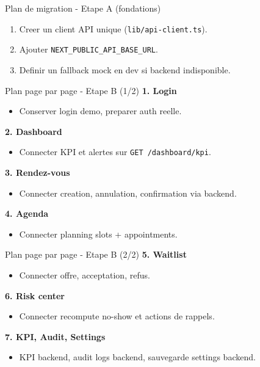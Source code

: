\documentclass[10pt,aspectratio=169]{beamer}
\begin{document}
\begin{frame}{Plan de migration - Etape A (fondations)}
  \begin{enumerate}
    \item Creer un client API unique (\texttt{lib/api-client.ts}).
    \item Ajouter \texttt{NEXT\_PUBLIC\_API\_BASE\_URL}.
    \item Definir un fallback mock en dev si backend indisponible.
  \end{enumerate}
\end{frame}

\begin{frame}{Plan page par page - Etape B (1/2)}
  \textbf{1. Login}
  \begin{itemize}
    \item Conserver login demo, preparer auth reelle.
  \end{itemize}
  \textbf{2. Dashboard}
  \begin{itemize}
    \item Connecter KPI et alertes sur \texttt{GET /dashboard/kpi}.
  \end{itemize}
  \textbf{3. Rendez-vous}
  \begin{itemize}
    \item Connecter creation, annulation, confirmation via backend.
  \end{itemize}
  \textbf{4. Agenda}
  \begin{itemize}
    \item Connecter planning slots + appointments.
  \end{itemize}
\end{frame}

\begin{frame}{Plan page par page - Etape B (2/2)}
  \textbf{5. Waitlist}
  \begin{itemize}
    \item Connecter offre, acceptation, refus.
  \end{itemize}
  \textbf{6. Risk center}
  \begin{itemize}
    \item Connecter recompute no-show et actions de rappels.
  \end{itemize}
  \textbf{7. KPI, Audit, Settings}
  \begin{itemize}
    \item KPI backend, audit logs backend, sauvegarde settings backend.
  \end{itemize}
\end{frame}
\end{document}

